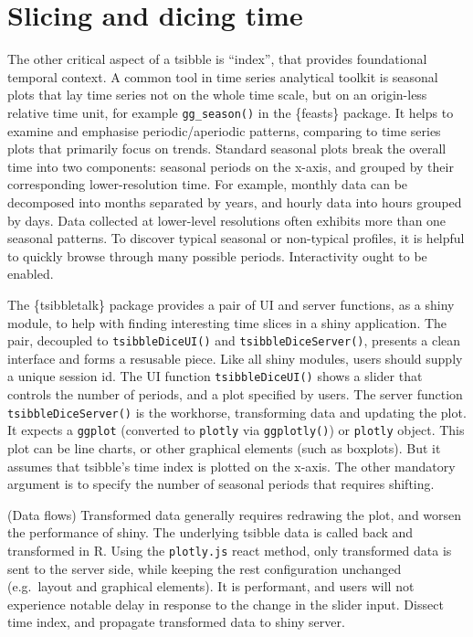 \hypertarget{slicing-and-dicing-time}{%
\section{Slicing and dicing time}\label{slicing-and-dicing-time}}

The other critical aspect of a tsibble is ``index'', that provides
foundational temporal context. A common tool in time series analytical
toolkit is seasonal plots that lay time series not on the whole time
scale, but on an origin-less relative time unit, for example
\texttt{gg\_season()} in the \{feasts\} package. It helps to examine and
emphasise periodic/aperiodic patterns, comparing to time series plots
that primarily focus on trends. Standard seasonal plots break the
overall time into two components: seasonal periods on the x-axis, and
grouped by their corresponding lower-resolution time. For example,
monthly data can be decomposed into months separated by years, and
hourly data into hours grouped by days. Data collected at lower-level
resolutions often exhibits more than one seasonal patterns. To discover
typical seasonal or non-typical profiles, it is helpful to quickly
browse through many possible periods. Interactivity ought to be enabled.

The \{tsibbletalk\} package provides a pair of UI and server functions,
as a shiny module, to help with finding interesting time slices in a
shiny application. The pair, decoupled to \texttt{tsibbleDiceUI()} and
\texttt{tsibbleDiceServer()}, presents a clean interface and forms a
resusable piece. Like all shiny modules, users should supply a unique
session id. The UI function \texttt{tsibbleDiceUI()} shows a slider that
controls the number of periods, and a plot specified by users. The
server function \texttt{tsibbleDiceServer()} is the workhorse,
transforming data and updating the plot. It expects a \texttt{ggplot}
(converted to \texttt{plotly} via \texttt{ggplotly()}) or
\texttt{plotly} object. This plot can be line charts, or other graphical
elements (such as boxplots). But it assumes that tsibble's time index is
plotted on the x-axis. The other mandatory argument is to specify the
number of seasonal periods that requires shifting.

(Data flows) Transformed data generally requires redrawing the plot, and
worsen the performance of shiny. The underlying tsibble data is called
back and transformed in R. Using the \texttt{plotly.js} react method,
only transformed data is sent to the server side, while keeping the rest
configuration unchanged (e.g.~layout and graphical elements). It is
performant, and users will not experience notable delay in response to
the change in the slider input. Dissect time index, and propagate
transformed data to shiny server.

